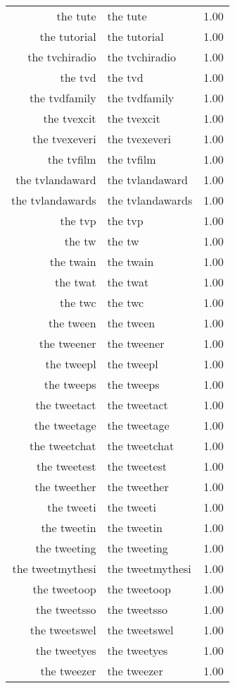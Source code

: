 \begin{table}[ht]
\begin{tabular}{rlr}
  the tute & the tute & 1.00 \\ 
  the tutorial & the tutorial & 1.00 \\ 
  the tvchiradio & the tvchiradio & 1.00 \\ 
  the tvd & the tvd & 1.00 \\ 
  the tvdfamily & the tvdfamily & 1.00 \\ 
  the tvexcit & the tvexcit & 1.00 \\ 
  the tvexeveri & the tvexeveri & 1.00 \\ 
  the tvfilm & the tvfilm & 1.00 \\ 
  the tvlandaward & the tvlandaward & 1.00 \\ 
  the tvlandawards & the tvlandawards & 1.00 \\ 
  the tvp & the tvp & 1.00 \\ 
  the tw & the tw & 1.00 \\ 
  the twain & the twain & 1.00 \\ 
  the twat & the twat & 1.00 \\ 
  the twc & the twc & 1.00 \\ 
  the tween & the tween & 1.00 \\ 
  the tweener & the tweener & 1.00 \\ 
  the tweepl & the tweepl & 1.00 \\ 
  the tweeps & the tweeps & 1.00 \\ 
  the tweetact & the tweetact & 1.00 \\ 
  the tweetage & the tweetage & 1.00 \\ 
  the tweetchat & the tweetchat & 1.00 \\ 
  the tweetest & the tweetest & 1.00 \\ 
  the tweether & the tweether & 1.00 \\ 
  the tweeti & the tweeti & 1.00 \\ 
  the tweetin & the tweetin & 1.00 \\ 
  the tweeting & the tweeting & 1.00 \\ 
  the tweetmythesi & the tweetmythesi & 1.00 \\ 
  the tweetoop & the tweetoop & 1.00 \\ 
  the tweetsso & the tweetsso & 1.00 \\ 
  the tweetswel & the tweetswel & 1.00 \\ 
  the tweetyes & the tweetyes & 1.00 \\ 
  the tweezer & the tweezer & 1.00 \\ 

\end{tabular}
\end{table}
